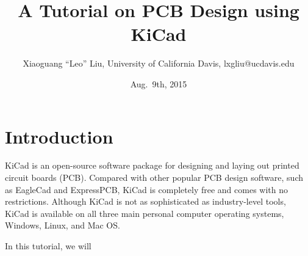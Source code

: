\documentclass[12pt,letterpaper]{article}
\title{A Tutorial on PCB Design using KiCad}
\author{Xiaoguang ``Leo'' Liu, University of California Davis, lxgliu@ucdavis.edu}
\date{Aug.~9th, 2015}
\begin{document}
\maketitle

\tableofcontents

\newpage
\section{Introduction}
KiCad is an open-source software package for designing and laying out printed circuit boards (PCB). Compared with other popular PCB design software, such as EagleCad and ExpressPCB, KiCad is completely free and comes with no restrictions. Although KiCad is not as sophisticated as industry-level tools, KiCad is available on all three main personal computer operating systems, Windows, Linux, and Mac OS. 

In this tutorial, we will 
\end{document}

